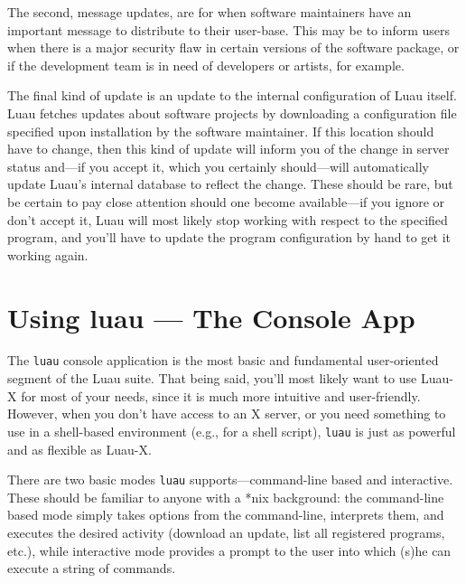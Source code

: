 \documentclass{report}
\begin{document}
The second, message updates, are for when software maintainers have an important message to distribute to their user-base.  This may be to inform users when there is a major security flaw in certain versions of the software package, or if the development team is in need of developers or artists, for example.

The final kind of update is an update to the internal configuration of Luau itself.  Luau fetches updates about software projects by downloading a configuration file specified upon installation by the software maintainer.  If this location should have to change, then this kind of update will inform you of the change in server status and---if you accept it, which you certainly should---will automatically update Luau's internal database to reflect the change.  These should be rare, but be certain to pay close attention should one become available---if you ignore or don't accept it, Luau will most likely stop working with respect to the specified program, and you'll have to update the program configuration by hand to get it working again.

\section{Using luau --- The Console App}

The \verb+luau+ console application is the most basic and fundamental user-oriented segment of the Luau suite.  That being said, you'll most likely want to use Luau-X for most of your needs, since it is much more intuitive and user-friendly.  However, when you don't have access to an X server, or you need something to use in a shell-based environment (e.g., for a shell script), \verb+luau+ is just as powerful and as flexible as Luau-X.

There are two basic modes \verb+luau+ supports---command-line based and interactive.  These should be familiar to anyone with a *nix background: the command-line based mode simply takes options from the command-line, interprets them, and executes the desired activity (download an update, list all registered programs, etc.), while interactive mode provides a prompt to the user into which (s)he can execute a string of commands.
\end{document}
